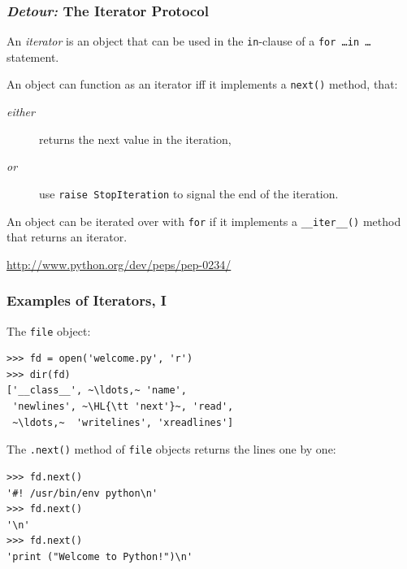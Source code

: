 \documentclass[english,serif,mathserif,xcolor=pdftex,dvipsnames,table]{beamer}
\begin{document}




\begin{frame}[fragile]
  \frametitle{\emph{Detour:} The Iterator Protocol}

  An \emph{iterator} is an object that can be used in the
  \texttt{in}-clause of a \texttt{for \ldots in \ldots} statement.

  \+
  An object can function as an iterator iff it implements a
  \texttt{next()} method, that:
  \begin{description}
  \item[\emph{either}] returns the next value in the iteration,
  \item[\emph{or}] use \lstinline|raise StopIteration| to signal the
    end of the iteration.
  \end{description}

  \+
  An object can be iterated over with \lstinline|for| if it implements a
  \lstinline|__iter__()| method that returns an iterator.

  \begin{references}
    \url{http://www.python.org/dev/peps/pep-0234/}
  \end{references}
\end{frame}


\begin{frame}[fragile]
  \frametitle{Examples of Iterators, I}

  The \texttt{file} object:
\begin{lstlisting}
>>> fd = open('welcome.py', 'r')
>>> dir(fd)
['__class__', ~\ldots,~ 'name',
 'newlines', ~\HL{\tt 'next'}~, 'read',
 ~\ldots,~  'writelines', 'xreadlines']
\end{lstlisting}

  \+
  The \texttt{.next()} method of \texttt{file} objects returns the
  lines one by one:
\begin{lstlisting}
>>> fd.next()
'#! /usr/bin/env python\n'
>>> fd.next()
'\n'
>>> fd.next()
'print ("Welcome to Python!")\n'
\end{lstlisting}

\end{frame}
\end{document}
